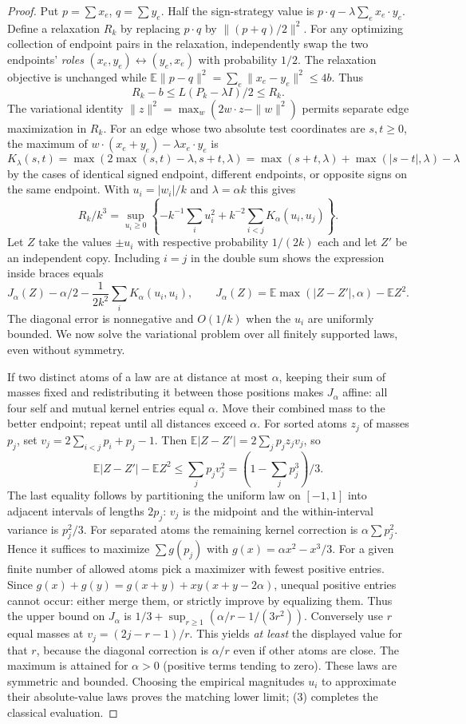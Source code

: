 \documentclass[11pt]{article}
\begin{document}
\begin{proof}
Put $p=\sum x_e$, $q=\sum y_e$. Half the sign-strategy value is $p\cdot q-\lambda\sum_e x_e\cdot y_e$. Define a relaxation $R_k$ by replacing $p\cdot q$ by $\|(p+q)/2\|^2$. For any optimizing collection of endpoint pairs in the relaxation, independently swap the two endpoints' \emph{roles} $(x_e,y_e)\leftrightarrow(y_e,x_e)$ with probability $1/2$. The relaxation objective is unchanged while $\mathbb E\|p-q\|^2=\sum_e\|x_e-y_e\|^2\le4b$. Thus
\[
 R_k-b\le L(P_k-\lambda I)/2\le R_k.\tag{3}
\]
The variational identity $\|z\|^2=\max_w(2w\cdot z-\|w\|^2)$ permits separate edge maximization in $R_k$. For an edge whose two absolute test coordinates are $s,t\ge0$, the maximum of $w\cdot(x_e+y_e)-\lambda x_e\cdot y_e$ is
\[
 K_\lambda(s,t)=\max(2\max(s,t)-\lambda,s+t,\lambda)
 =\max(s+t,\lambda)+\max(|s-t|,\lambda)-\lambda
\]
by the cases of identical signed endpoint, different endpoints, or opposite signs on the same endpoint. With $u_i=|w_i|/k$ and $\lambda=\alpha k$ this gives
\[
 R_k/k^3 =\sup_{u_i\ge0}\left\{-k^{-1}\sum_i u_i^2+
 k^{-2}\sum_{i<j}K_\alpha(u_i,u_j)\right\}.
\]
Let $Z$ take the values $\pm u_i$ with respective probability $1/(2k)$ each and let $Z'$ be an independent copy. Including $i=j$ in the double sum shows the expression inside braces equals
\[
 J_\alpha(Z)-\alpha/2-\frac1{2k^2}\sum_iK_\alpha(u_i,u_i),
 \qquad J_\alpha(Z)=\mathbb E\max(|Z-Z'|,\alpha)-\mathbb E Z^2 .
\]
The diagonal error is nonnegative and $O(1/k)$ when the $u_i$ are uniformly bounded. We now solve the variational problem over all finitely supported laws, even without symmetry.

If two distinct atoms of a law are at distance at most $\alpha$, keeping their sum of masses fixed and redistributing it between those positions makes $J_\alpha$ affine: all four self and mutual kernel entries equal $\alpha$. Move their combined mass to the better endpoint; repeat until all distances exceed $\alpha$. For sorted atoms $z_j$ of masses $p_j$, set $v_j=2\sum_{i<j}p_i+p_j-1$. Then $\mathbb E|Z-Z'|=2\sum_j p_j z_jv_j$, so
\[
 \mathbb E|Z-Z'|-\mathbb E Z^2\le\sum_j p_jv_j^2=(1-\sum_jp_j^3)/3.
\]
The last equality follows by partitioning the uniform law on $[-1,1]$ into adjacent intervals of lengths $2p_j$: $v_j$ is the midpoint and the within-interval variance is $p_j^2/3$. For separated atoms the remaining kernel correction is $\alpha\sum p_j^2$. Hence it suffices to maximize $\sum g(p_j)$ with $g(x)=\alpha x^2-x^3/3$. For a given finite number of allowed atoms pick a maximizer with fewest positive entries. Since $g(x)+g(y)=g(x+y)+xy(x+y-2\alpha)$, unequal positive entries cannot occur: either merge them, or strictly improve by equalizing them. Thus the upper bound on $J_\alpha$ is $1/3+\sup_{r\ge1}(\alpha/r-1/(3r^2))$. Conversely use $r$ equal masses at $v_j=(2j-r-1)/r$. This yields \emph{at least} the displayed value for that $r$, because the diagonal correction is $\alpha/r$ even if other atoms are close. The maximum is attained for $\alpha>0$ (positive terms tending to zero). These laws are symmetric and bounded. Choosing the empirical magnitudes $u_i$ to approximate their absolute-value laws proves the matching lower limit; (3) completes the classical evaluation.


\end{proof}
\end{document}
